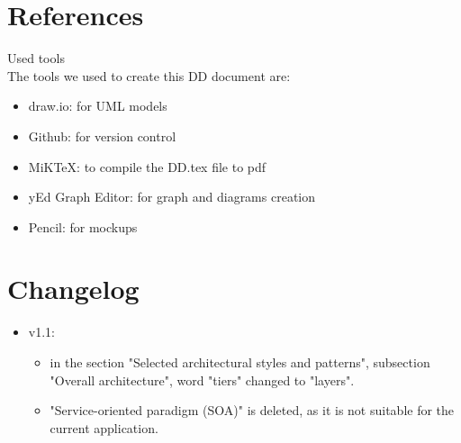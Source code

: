 \documentclass[12pt, letterpaper]{article}
\begin{document}
\newpage
\section{References}
Used tools \\
The tools we used to create this DD document are:
\begin{itemize}
	\item draw.io: for UML models
	\item Github: for version control
	\item MiKTeX: to compile the DD.tex file to pdf
	\item yEd Graph Editor: for graph and diagrams creation
	\item Pencil: for mockups
\end{itemize}
\newpage


\section{Changelog}
\begin{itemize}
	\item v1.1:
	\begin{itemize}
		\item in the section "Selected architectural styles and patterns", subsection "Overall architecture", word "tiers" changed to "layers".
		\item "Service-oriented paradigm (SOA)" is deleted, as it is not suitable for the current application.  
	\end{itemize}	 	
\end{itemize}
\end{document}
